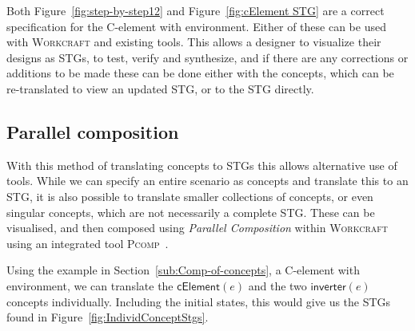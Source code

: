 \documentclass[british,compsoc]{IEEEtran}
\newcommand{\noun}[1]{\textsc{#1}}
\begin{document}
Both Figure~\ref{fig:step-by-step12} and Figure~\ref{fig:cElement STG} are a correct specification for the C-element with environment. Either of these can be used with
\noun{Workcraft} and existing tools. This allows a designer to visualize their designs as STGs, to test, verify and synthesize, and if there are any corrections or additions to be made
these can be done either with the concepts, which can be re-translated to view an updated STG, or to the STG directly.



\subsection{Parallel composition}

With this method of translating concepts to STGs this allows alternative use of tools. While we can specify an entire scenario as concepts and translate this to an STG, it is also possible to
translate smaller collections of concepts, or even singular concepts, which are not necessarily a complete STG. These can be visualised, and then composed using
\emph{Parallel Composition}
within \noun{Workcraft} using an integrated tool \noun{Pcomp}~\cite{PCOMP}.

Using the example in Section~\ref{sub:Comp-of-concepts}, a C-element with environment, we can translate the $\mathsf{cElement}(e)$ and the two $\mathsf{inverter}(e)$ concepts
individually. Including the initial states, this would give us the STGs found in Figure~\ref{fig:IndividConceptStgs}.
\end{document}
